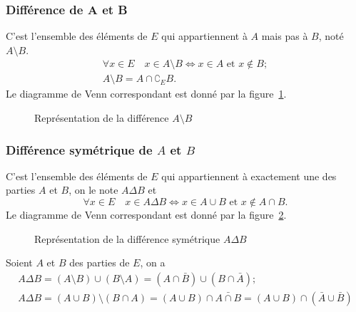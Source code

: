 \subsubsection{Différence de A et B}
\label{chap3-subsubsec:difference}
C'est l'ensemble des éléments de $E$ qui appartiennent à $A$ mais pas à $B$, noté $A \setminus B$.
\begin{gather}
  \forall x \in E \quad x \in A \setminus B \iff x \in A \text{~et~} x \not\in B; \\
  A \setminus B=A \cap \complement_E B.
\end{gather}
Le diagramme de Venn correspondant est donné par la figure~\ref{chap3-fig:diff}.
\begin{figure}[h]
\centering
{}
\caption{Représentation de la différence $A \setminus B$}
\label{chap3-fig:diff}
\end{figure}

\subsubsection{Différence symétrique de $A$ et $B$}
\label{chap3-subsubsec:differencesymetrique}
C'est l'ensemble des éléments de $E$ qui appartiennent à exactement une des parties $A$ et $B$, on le note $A \Delta B$ et
\begin{equation}
  \forall x \in E \quad x \in A \Delta B \iff x \in A \cup B \text{~et~} x \not\in A \cap B.
\end{equation}
Le diagramme de Venn correspondant est donné par la figure~\ref{chap3-fig:diffsym}.
\begin{figure}[h]
\centering
{}
\caption{Représentation de la différence symétrique $A \Delta B$}
\label{chap3-fig:diffsym}
\end{figure}
%
\begin{prop}
  Soient $A$ et $B$ des parties de $E$, on a 
  \begin{gather}
    A \Delta B = (A\setminus B) \cup (B \setminus A) = (A \cap \bar{B}) \cup (B \cap \bar{A}); \\
    A \Delta B =(A \cup B) \setminus (B \cap A) = (A \cup B) \cap \bar{A \cap B} =(A \cup B) \cap (\bar{A} \cup \bar{B})
  \end{gather}
\end{prop}
%
